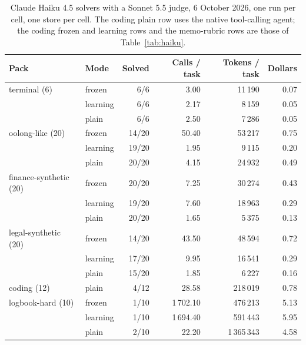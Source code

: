 \documentclass[11pt,a4paper]{article}
\begin{document}
\begin{table}[htbp]
\centering
\small
\begin{tabular}{@{}llrrrr@{}}
\toprule
Pack & Mode & Solved & Calls / task & Tokens / task & Dollars \\
\midrule
terminal (6)           & frozen   & 6/6   & 3.00     & 11\,190     & 0.07 \\
                       & learning & 6/6   & 2.17     & 8\,159      & 0.05 \\
                       & plain    & 6/6   & 2.50     & 7\,286      & 0.05 \\
\addlinespace
oolong-like (20)       & frozen   & 14/20 & 50.40    & 53\,217     & 0.75 \\
                       & learning & 19/20 & 1.95     & 9\,115      & 0.20 \\
                       & plain    & 20/20 & 4.15     & 24\,932     & 0.49 \\
\addlinespace
finance-synthetic (20) & frozen   & 20/20 & 7.25     & 30\,274     & 0.43 \\
                       & learning & 19/20 & 7.60     & 18\,963     & 0.29 \\
                       & plain    & 20/20 & 1.65     & 5\,375      & 0.13 \\
\addlinespace
legal-synthetic (20)   & frozen   & 14/20 & 43.50    & 48\,594     & 0.72 \\
                       & learning & 17/20 & 9.95     & 16\,541     & 0.29 \\
                       & plain    & 15/20 & 1.85     & 6\,227      & 0.16 \\
\addlinespace
coding (12)            & plain    & 4/12  & 28.58    & 218\,019    & 0.78 \\
\addlinespace
logbook-hard (10)      & frozen   & 1/10  & 1\,702.10 & 476\,213   & 5.13 \\
                       & learning & 1/10  & 1\,694.40 & 591\,443   & 5.95 \\
                       & plain    & 2/10  & 22.20    & 1\,365\,343 & 4.58 \\
\bottomrule
\end{tabular}
\caption{Claude Haiku 4.5 solvers with a Sonnet 5.5 judge, 6 October 2026,
one run per cell, one store per cell. The coding plain row uses the native
tool-calling agent; the coding frozen and learning rows and the memo-rubric
rows are those of Table~\ref{tab:haiku}.}
\label{tab:haiku2}
\end{table}
\end{document}
